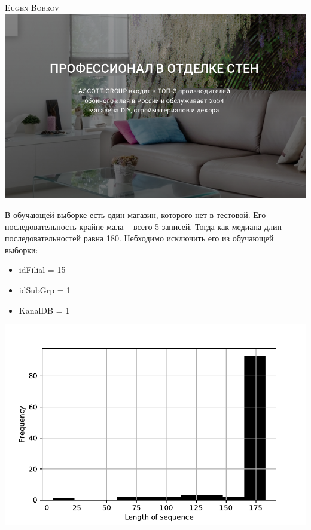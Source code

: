 \documentclass[russian, 10pt]{beamer}
\begin{document}
\begin{frame}
\centering
\textsc{\textcolor{black}{Eugen Bobrov}}\\[2mm]
\includegraphics[scale=0.35]{images/2.png}
\end{frame}

\begin{frame}
В обучающей выборке есть один магазин, которого нет в тестовой. Его последовательность крайне мала -- всего 5 записей. Тогда как медиана длин последовательностей равна 180. Небходимо исключить его из обучающей выборки:

\begin{itemize}

\item idFilial = 15
\item idSubGrp = 1
\item KanalDB = 1

\end{itemize}

\includegraphics[scale=0.5]{images/sizes.pdf}


\end{frame}
\end{document}
